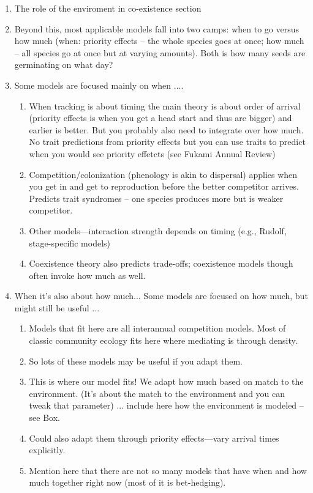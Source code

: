 \documentclass[11pt,letterpaper]{article}
\begin{document}
\begin{enumerate}
\begin{enumerate}
\item The role of the enviroment in co-existence section
\item Beyond this, most applicable models fall into two camps:  when to go versus how much (when: priority effects -- the whole species goes at once; how much -- all species go at once but at varying amounts). Both is how many seeds are germinating on what day?
\item Some models are focused mainly on when .... 
\begin{enumerate}
\item When tracking is about timing the main theory is about order of arrival (priority effects is when you get a head start and thus are bigger) and earlier is better. But you probably also need to integrate over how much. No trait predictions from priority effects but you can use traits to predict when you would see priority effetcts (see Fukami Annual Review)
\item Competition/colonization (phenology is akin to dispersal) applies when you get in and get to reproduction before the better competitor arrives. Predicts trait syndromes -- one species produces more but is weaker competitor. 
\item Other models---interaction strength depends on timing (e.g., Rudolf, stage-specific models) 
\item Coexistence theory also predicts trade-offs; coexistence models though often invoke how much as well. 
\end{enumerate}
\item When it's also about how much... Some models are focused on how much, but might still be useful ... 
\begin{enumerate}
\item Models that fit here are all interannual competition models. Most of classic community ecology fits here where mediating is through density.
\item So lots of these models may be useful if you adapt them. 
\item This is where our model fits! We adapt how much based on match to the environment. (It's about the match to the environment and you can tweak that parameter) ... include here how the environment is modeled -- see Box.  
\item Could also adapt them through priority effects---vary arrival times explicitly. 
\item Mention here that there are not so many models that have when and how much together right now (most of it is bet-hedging). 

\end{enumerate}
\end{enumerate}
\end{enumerate}
\end{document}
